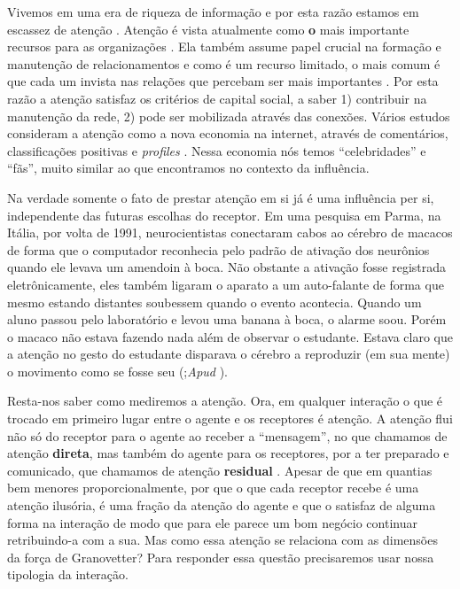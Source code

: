 \documentclass{article}
\begin{document}
Vivemos em uma era de riqueza de informação e por esta razão estamos em escassez
de atenção \cite{Goldhaber1997}. Atenção é vista atualmente como \textbf{o} mais
importante recursos para as organizações \cite{Davenport2001}. Ela também assume
papel crucial na formação e manutenção de relacionamentos e como é um recurso
limitado, o mais comum é que cada um invista nas relações que percebam ser mais
importantes \cite{Dindia1993}. Por esta razão a atenção satisfaz os critérios de
capital social, a saber 1) contribuir na manutenção da rede, 2) pode ser
mobilizada através das conexões. Vários estudos consideram a atenção como a nova
economia na internet, através de comentários, classificações positivas e
\textit{profiles} \cite{Humphreys2009} \cite{Wu2009} \cite{Skageby2009}. Nessa
economia nós temos ``celebridades'' e ``fãs'', muito similar ao que encontramos
no contexto da influência.

Na verdade somente o fato de prestar atenção em si já é uma influência per si,
independente das futuras escolhas do receptor. Em uma pesquisa em Parma, na
Itália, por volta de 1991, neurocientistas conectaram cabos ao cérebro de macacos
de forma que o computador reconhecia pelo padrão de ativação dos neurônios quando
ele levava um amendoin à boca. Não obstante a ativação fosse registrada
eletrônicamente, eles também ligaram o aparato a um auto-falante de forma que
mesmo estando distantes soubessem quando o evento acontecia. Quando um aluno
passou pelo laboratório e levou uma banana à boca, o alarme soou. Porém o macaco
não estava fazendo nada além de observar o estudante. Estava claro que a atenção
no gesto do estudante disparava o cérebro a reproduzir (em sua mente) o movimento
como se fosse seu (\cite{Rizzolatti1996};\textit{Apud} \cite{Goldhaber2006}).

Resta-nos saber como mediremos a atenção. Ora, em qualquer interação o que é
trocado em primeiro lugar entre o agente e os receptores é atenção. A atenção
flui não só do receptor para o agente ao receber a ``mensagem'', no que chamamos
de atenção \textbf{direta}, mas também do agente para os receptores, por a ter
preparado e comunicado, que chamamos de atenção \textbf{residual}
\cite{Goldhaber1997}. Apesar de que em quantias bem menores proporcionalmente,
por que o que cada receptor recebe é uma atenção ilusória, é uma fração da
atenção do agente e que o satisfaz de alguma forma na interação de modo que para
ele parece um bom negócio continuar retribuindo-a com a sua. Mas como essa
atenção se relaciona com as dimensões da força de Granovetter? Para responder
essa questão precisaremos usar nossa tipologia da interação.
\end{document}

